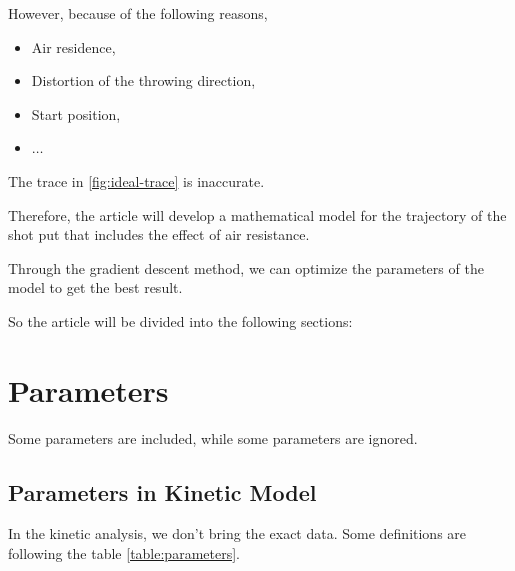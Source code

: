 \documentclass{article}
\begin{document}
However, because of the following reasons,

\begin{itemize}
    \item Air residence,
    \item Distortion of the throwing direction,
    \item Start position,
    \item $\dots$
\end{itemize}

The trace in \ref{fig:ideal-trace} is inaccurate.

Therefore, the article will develop a mathematical model for the trajectory of the shot put that includes the effect of air resistance.

Through the gradient descent method, we can optimize the parameters of the model to get the best result.

So the article will be divided into the following sections:

\section{Parameters}

\label{section:parameters}

Some parameters are included, while some parameters are ignored.

\subsection{Parameters in Kinetic Model}

\label{subsection:parameters}

In the kinetic analysis, we don't bring the exact data. Some definitions are following the table \ref{table:parameters}.
\end{document}
